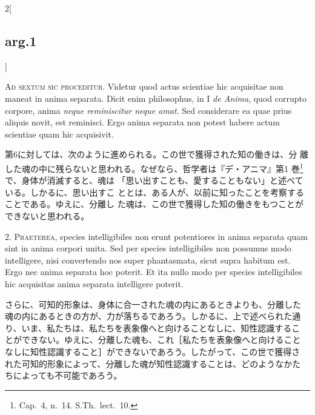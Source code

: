 \documentclass[paper=a4paper,fontsize=10pt,jafontsize=9pt,titlepage]{jlreq}
\begin{document}
\begin{paracol}{2}[\subsection{arg.1}]

{\huge A}{\scshape d sextum sic proceditur}. Videtur quod actus scientiae
hic acquisitae non maneat in anima separata. Dicit enim philosophus,
in I {\itshape de Anima}, quod corrupto corpore, anima {\itshape neque
reminiscitur neque amat}. Sed considerare ea quae prius aliquis novit,
est reminisci. Ergo anima separata non potest habere actum scientiae
quam hic acquisivit.

\switchcolumn

第6に対しては、次のように進められる。この世で獲得された知の働きは、分
離した魂の中に残らないと思われる。なぜなら、哲学者は『デ・アニマ』第1
巻\footnote{Cap.~4, n.~14. S.Th.~lect.~10.}で、身体が消滅すると、魂は
「思い出すことも、愛することもない」と述べている。しかるに、思い出すこ
ととは、ある人が、以前に知ったことを考察することである。ゆえに、分離し
た魂は、この世で獲得した知の働きをもつことができないと思われる。


2. {\scshape Praeterea}, species intelligibiles non erunt potentiores in
anima separata quam sint in anima corpori unita. Sed per species
intelligibiles non possumus modo intelligere, nisi convertendo nos
super phantasmata, sicut supra habitum est. Ergo nec anima separata
hoc poterit. Et ita nullo modo per species intelligibiles hic
acquisitas anima separata intelligere poterit.

\switchcolumn

さらに、可知的形象は、身体に合一された魂の内にあるときよりも、分離した
魂の内にあるときの方が、力が落ちるであろう。しかるに、上で述べられた通
り、いま、私たちは、私たちを表象像へと向けることなしに、知性認識するこ
とができない。ゆえに、分離した魂も、これ［私たちを表象像へと向けること
なしに知性認識すること］ができないであろう。したがって、この世で獲得さ
れた可知的形象によって、分離した魂が知性認識することは、どのようなかた
ちによっても不可能であろう。



\end{paracol}
\end{document}
